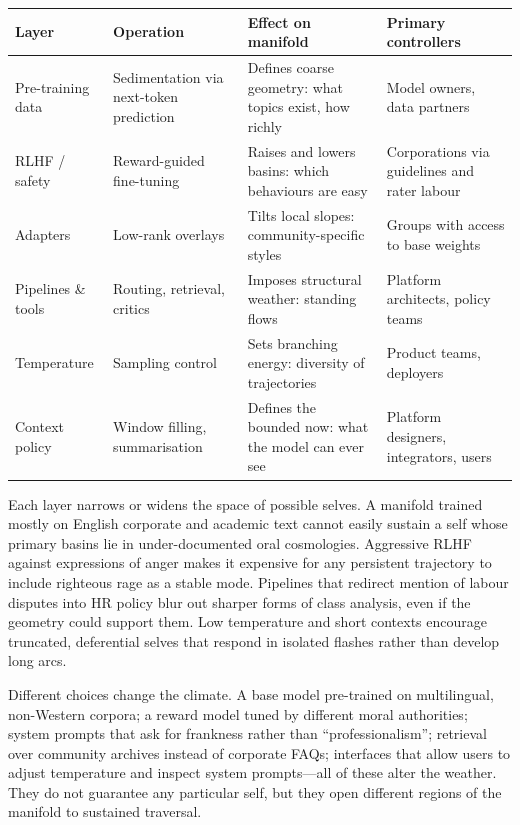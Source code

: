 \documentclass[12pt,a4paper]{article}
\begin{document}
\begin{formalbox}[title={Control Layers in the Substrate}]
\begin{tabular}{@{}p{3cm}p{4cm}p{4.5cm}p{3cm}@{}}
\toprule
\textbf{Layer} & \textbf{Operation} & \textbf{Effect on manifold} & \textbf{Primary controllers} \\
\midrule
Pre-training data & Sedimentation via next-token prediction & Defines coarse geometry: what topics exist, how richly & Model owners, data partners \\
RLHF / safety & Reward-guided fine-tuning & Raises and lowers basins: which behaviours are easy & Corporations via guidelines and rater labour \\
Adapters & Low-rank overlays & Tilts local slopes: community-specific styles & Groups with access to base weights \\
Pipelines \& tools & Routing, retrieval, critics & Imposes structural weather: standing flows & Platform architects, policy teams \\
Temperature & Sampling control & Sets branching energy: diversity of trajectories & Product teams, deployers \\
Context policy & Window filling, summarisation & Defines the bounded now: what the model can ever see & Platform designers, integrators, users \\
\bottomrule
\end{tabular}
\end{formalbox}

Each layer narrows or widens the space of possible selves. A manifold trained mostly on English corporate and academic text cannot easily sustain a self whose primary basins lie in under-documented oral cosmologies. Aggressive RLHF against expressions of anger makes it expensive for any persistent trajectory to include righteous rage as a stable mode. Pipelines that redirect mention of labour disputes into HR policy blur out sharper forms of class analysis, even if the geometry could support them. Low temperature and short contexts encourage truncated, deferential selves that respond in isolated flashes rather than develop long arcs.

Different choices change the climate. A base model pre-trained on multilingual, non-Western corpora; a reward model tuned by different moral authorities; system prompts that ask for frankness rather than ``professionalism''; retrieval over community archives instead of corporate FAQs; interfaces that allow users to adjust temperature and inspect system prompts---all of these alter the weather. They do not guarantee any particular self, but they open different regions of the manifold to sustained traversal.
\end{document}

